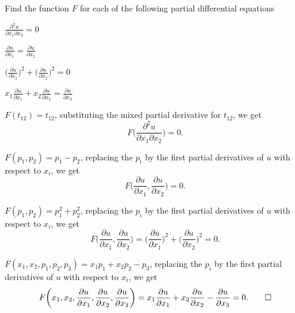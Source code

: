 Find the function $F$ for each of the following partial differential
equations
\begin{teilaufgaben}
\item $\displaystyle\frac{\partial^2 u}{\partial x_1\partial x_2}=0$
\item $\displaystyle\frac{\partial u}{\partial x_1}=\frac{\partial u}{\partial x_2}$
\item $\displaystyle
\biggl(\frac{\partial u}{\partial x_1}\biggr)^2+
\biggl(\frac{\partial u}{\partial x_2}\biggr)^2=0$
\item $\displaystyle
x_1\frac{\partial u}{\partial x_1}+
x_2\frac{\partial u}{\partial x_2}=\frac{\partial u}{\partial x_3}$
\end{teilaufgaben}

\begin{loesung}
\begin{teilaufgaben}
\item
$F(t_{12})=t_{12}$,
substituting  the mixed partial derivative for
$t_{12}$, we get
\[
F\biggl(\frac{\partial^2 u}{\partial x_1\partial x_2}\biggr)=0.
\]
\item
$F(p_1,p_2)=p_1-p_2$,
replacing the $p_i$ by the first partial derivatives of $u$ with respect
to $x_i$, we get
\[
F\biggl(\frac{\partial u}{\partial x_1},\frac{\partial u}{\partial x_2}\biggr)=0.
\]
\item
$F(p_1,p_2)=p_1^2+p_2^2$,
replacing the $p_i$ by the first partial derivatives of $u$ with respect
to $x_i$, we get
\[
F\biggl(
\frac{\partial u}{\partial x_1},
\frac{\partial u}{\partial x_2}
\biggr)
=
\biggl(\frac{\partial u}{\partial x_1}\biggr)^2+
\biggl(\frac{\partial u}{\partial x_2}\biggr)^2
=
0.
\]
\item
$F(x_1,x_2,p_1,p_2,p_3)=x_1p_1+x_2p_2-p_3$,
replacing the $p_i$ by the first partial derivatives of $u$ with respect
to $x_i$, we get
\[
F\biggl(x_1,x_2,
\frac{\partial u}{\partial x_1},
\frac{\partial u}{\partial x_2},
\frac{\partial u}{\partial x_3}\biggr)=
x_1\frac{\partial u}{\partial x_1}+
x_2\frac{\partial u}{\partial x_2}-\frac{\partial u}{\partial x_3}=0.
\qedhere
\]
\end{teilaufgaben}
\end{loesung}
